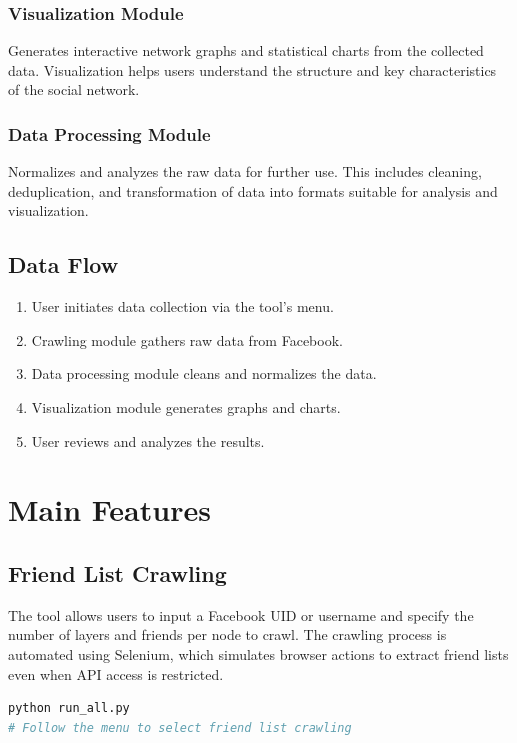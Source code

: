 \documentclass[13pt,a4paper]{report}
\begin{document}
\subsection{Visualization Module}
Generates interactive network graphs and statistical charts from the collected data. Visualization helps users understand the structure and key characteristics of the social network.

\subsection{Data Processing Module}
Normalizes and analyzes the raw data for further use. This includes cleaning, deduplication, and transformation of data into formats suitable for analysis and visualization.

\section{Data Flow}
\begin{enumerate}
    \item User initiates data collection via the tool's menu.
    \item Crawling module gathers raw data from Facebook.
    \item Data processing module cleans and normalizes the data.
    \item Visualization module generates graphs and charts.
    \item User reviews and analyzes the results.
\end{enumerate}

\chapter{Main Features}
\section{Friend List Crawling}
The tool allows users to input a Facebook UID or username and specify the number of layers and friends per node to crawl. The crawling process is automated using Selenium, which simulates browser actions to extract friend lists even when API access is restricted.

\begin{lstlisting}[language=Python, caption=Example: Initiating Friend List Crawling]
python run_all.py
# Follow the menu to select friend list crawling
\end{lstlisting}
\end{document}
